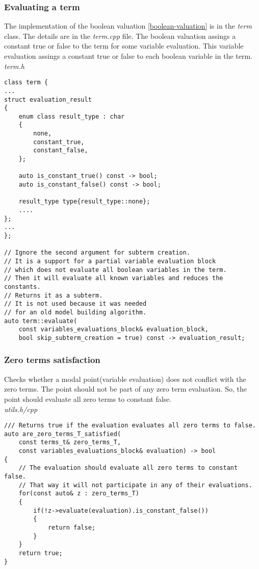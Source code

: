 \documentclass{article}
\begin{document}
	\newpage
	\subsubsection*{Evaluating a term}
	The implementation of the boolean valuation \ref{boolean-valuation} is in the \textit{term} class. The details are in the \textit{term.cpp} file.
	The boolean valuation assings a constant true or false to the term for some variable evaluation. This variable evaluation assings a constant true or false to each boolean variable in the term.
\\
\noindent
\textit{term.h}
\begin{lstlisting}
class term {
...
struct evaluation_result
{
    enum class result_type : char
    {
        none,
        constant_true,
        constant_false,
    };

    auto is_constant_true() const -> bool;
    auto is_constant_false() const -> bool;

    result_type type{result_type::none};
	....
};
...
};

// Ignore the second argument for subterm creation.
// It is a support for a partial variable evaluation block
// which does not evaluate all boolean variables in the term.
// Then it will evaluate all known variables and reduces the constants.
// Returns it as a subterm.
// It is not used because it was needed
// for an old model building algorithm.
auto term::evaluate(
	const variables_evaluations_block& evaluation_block,
	bool skip_subterm_creation = true) const -> evaluation_result;
\end{lstlisting}

	\newpage
	\subsubsection*{Zero terms satisfaction}
	Checks whether a modal point(variable evaluation) does not conflict with the zero terms. The point should not be part of any zero term evaluation. So, the point should evaluate all zero terms to constant false.
\\
\noindent
\textit{utils.h/cpp}
\begin{lstlisting}
/// Returns true if the evaluation evaluates all zero terms to false.
auto are_zero_terms_T_satisfied(
	const terms_t& zero_terms_T,
	const variables_evaluations_block& evaluation) -> bool
{
    // The evaluation should evaluate all zero terms to constant false.
    // That way it will not participate in any of their evaluations.
    for(const auto& z : zero_terms_T)
    {
        if(!z->evaluate(evaluation).is_constant_false())
        {
            return false;
        }
    }
    return true;
}
\end{lstlisting}
\end{document}
